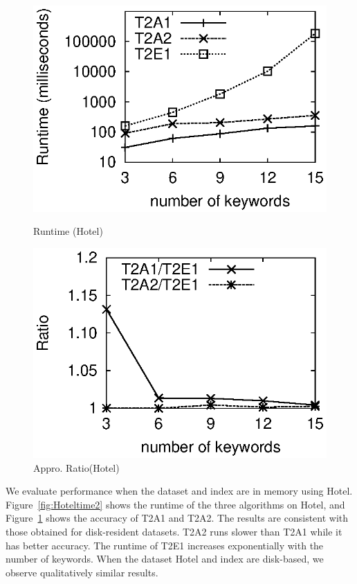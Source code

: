 \documentclass{sig-alternate}
\begin{document}
\begin{figure}[h]
\vspace{-1ex}
\begin{minipage}[bt]{1.6in}
 \includegraphics[scale=0.5]{figure/Hoteltime2}\vspace{-2ex}
\caption{Runtime (Hotel)} \label{fig:Hoteltime2}
\end{minipage}\hspace{2mm}
\begin{minipage}[bt]{1.7in}
 \includegraphics[scale=0.5]{figure/Hotelratio2}\vspace{-2ex}
\caption{Appro.\! Ratio(Hotel)} \label{fig:Hotelratio2}
\end{minipage}
\end{figure}
%
We evaluate performance when the dataset and
index are in memory using \textsf{Hotel}.
%
Figure~\ref{fig:Hoteltime2} shows the runtime of the three
algorithms on \textsf{Hotel}, and Figure~\ref{fig:Hotelratio2} shows
the accuracy of T2A1 and T2A2. The results are consistent with those
obtained for disk-resident datasets.
%
T2A2 runs slower than T2A1 while it has better accuracy. The runtime
of T2E1 increases exponentially with the number of keywords.
%
When the dataset \textsf{Hotel} and index are disk-based, we observe
qualitatively similar results.
\end{document}
